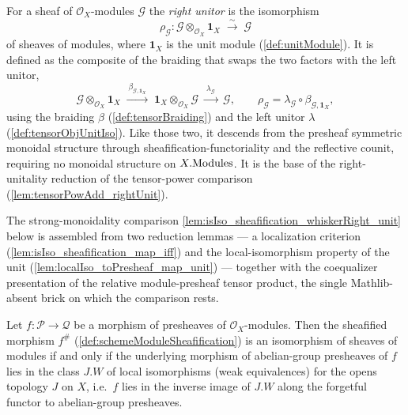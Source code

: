 \begin{definition}



  \label{def:tensorObjRightUnitor}
  For a sheaf of \(\mathcal{O}_X\)-modules \(\mathcal{G}\) the \emph{right unitor}
  is the isomorphism
  \[
    \rho_{\mathcal{G}} :
      \mathcal{G} \otimes_{\mathcal{O}_X} \mathbf{1}_X
      \;\xrightarrow{\ \sim\ }\; \mathcal{G}
  \]
  of sheaves of modules, where \(\mathbf{1}_X\) is the unit module
  (\cref{def:unitModule}). It is defined as the composite of the braiding that
  swaps the two factors with the left unitor,
  \[
    \mathcal{G} \otimes_{\mathcal{O}_X} \mathbf{1}_X
      \;\xrightarrow{\ \beta_{\mathcal{G}, \mathbf{1}_X}\ }\;
      \mathbf{1}_X \otimes_{\mathcal{O}_X} \mathcal{G}
      \;\xrightarrow{\ \lambda_{\mathcal{G}}\ }\;
      \mathcal{G},
    \qquad
    \rho_{\mathcal{G}}
      = \lambda_{\mathcal{G}} \circ \beta_{\mathcal{G}, \mathbf{1}_X},
  \]
  using the braiding \(\beta\) (\cref{def:tensorBraiding}) and the left unitor
  \(\lambda\) (\cref{def:tensorObjUnitIso}). Like those two, it descends from the
  presheaf symmetric monoidal structure through sheafification-functoriality and
  the reflective counit, requiring no monoidal structure on \(X.\mathrm{Modules}\). It is
  the base of the right-unitality reduction of the tensor-power comparison
  (\cref{lem:tensorPowAdd_rightUnit}).
\end{definition}





The strong-monoidality comparison \cref{lem:isIso_sheafification_whiskerRight_unit}
below is assembled from two reduction lemmas --- a localization criterion
(\cref{lem:isIso_sheafification_map_iff}) and the local-isomorphism property of
the unit (\cref{lem:localIso_toPresheaf_map_unit}) --- together with the
coequalizer presentation of the relative module-presheaf tensor product, the single
Mathlib-absent brick on which the comparison rests.

\begin{lemma}
  \label{lem:isIso_sheafification_map_iff}
  Let \(f : \mathcal{P} \to \mathcal{Q}\) be a morphism of presheaves of
  \(\mathcal{O}_X\)-modules. Then the sheafified morphism \(f^{\#}\)
  (\cref{def:schemeModuleSheafification}) is an isomorphism of sheaves of modules
  if and only if the underlying morphism of abelian-group presheaves of \(f\)
  lies in the class \(J.W\) of local isomorphisms (weak equivalences) for the
  opens topology \(J\) on \(X\), i.e.\ \(f\) lies in the inverse image of \(J.W\)
  along the forgetful functor to abelian-group presheaves.
\end{lemma}

